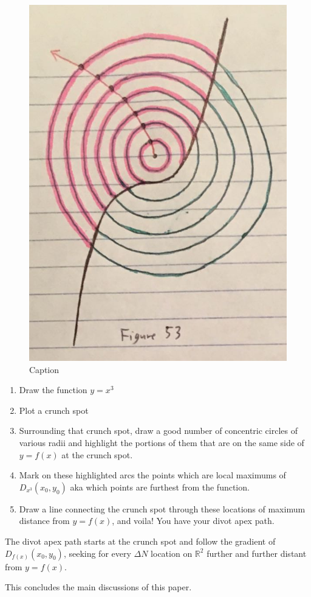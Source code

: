 \begin{figure}
  \label{divot:14}
  \includegraphics[width=\fw]{img/12-divot/14.png}
  \caption{Caption}
\end{figure}

\begin{enumerate}
  \item Draw the function $y = x^3$
  \item Plot a crunch spot
  \item Surrounding that crunch spot, draw a good number of concentric circles of various radii and highlight the portions of them that are on the same side of $y = f(x)$ at the crunch spot.
  \item Mark on these highlighted arcs the points which are local maximums of $D_{x^3} (x_0, y_0)$ aka which points are furthest from the function.
  \item Draw a line connecting the crunch spot through these locations of maximum distance from $y = f(x)$, and voila! You have your divot apex path.
\end{enumerate}

The divot apex path starts at the crunch spot and follow the gradient of $D_{f(x)} (x_0, y_0)$, seeking for every $\Delta N$ location on $\mathbb{R}^2$ further and further distant from $y = f(x)$.

This concludes the main discussions of this paper.

